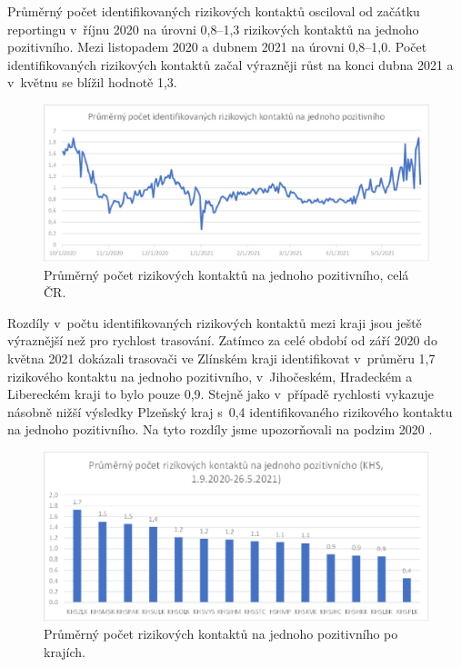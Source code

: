 Průměrný počet identifikovaných rizikových kontaktů osciloval od začátku reportingu v~říjnu 2020 na úrovni 0,8--1,3 rizikových kontaktů na jednoho pozitivního. Mezi listopadem 2020 a dubnem 2021 na úrovni 0,8--1,0. Počet identifikovaných rizikových kontaktů začal výrazněji růst na konci dubna 2021 a v~květnu se blížil hodnotě 1,3.

\begin{figure}[ht]
    \centering
    \includegraphics[width=1\textwidth]{./pic/e.eps}
    \caption{Průměrný počet rizikových kontaktů na jednoho pozitivního, celá ČR.}
    \label{fig:rizik1}
\end{figure}

Rozdíly v~počtu identifikovaných rizikových kontaktů mezi kraji jsou ještě vý\-raz\-něj\-ší než pro rychlost trasování. Zatímco za celé období od září 2020 do května 2021 dokázali trasovači ve Zlínském kraji identifikovat v~průměru 1,7 rizikového kontaktu na jednoho pozitivního, v~Jihočeském, Hradeckém a Libereckém kraji to bylo pouze 0,9. Stejně jako v~případě rychlosti vykazuje násobně nižší výsledky Plzeňský kraj s~0,4 identifikovaného rizikového kontaktu na jednoho pozitivního. Na tyto rozdíly jsme upozorňovali na podzim 2020 \cite{tr_bisop04}.

\begin{figure}[ht]
    \centering
    \includegraphics[width=1\textwidth]{./pic/f.eps}
    \caption{Průměrný počet rizikových kontaktů na jednoho pozitivního po krajích.}
    \label{fig:rizik1kraj}
\end{figure}


